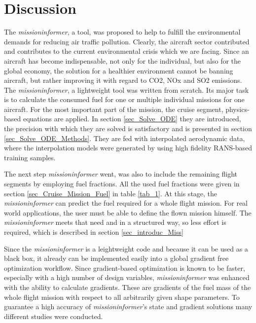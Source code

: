 \chapter{Discussion}
The \emph{missioninformer}, a tool, was 
proposed to  help to fulfill the  
environmental demands for reducing air traffic pollution. Clearly, the aircraft 
sector contributed and contributes 
to the current environmental crisis which we 
are facing. Since an aircraft has become 
indispensable, not only for the individual, 
but also for the global economy, the solution 
for a healthier environment cannot be 
banning aircraft, but rather improving it 
with regard to CO2, NOx and SO2 emissions. 
The \emph{missioninformer}, a lightweight tool was 
written from scratch. 
Its major task is 
to calculate the consumed fuel for
one or multiple individual 
missions for one aircraft. For the most 
important part of the mission, the cruise segment, 
physics-based equations are applied. In section \ref{sec_Solve_ODE}
they are introduced, the precision 
with which they are solved is satisfactory and 
is presented in section \ref{sec_Solve_ODE_Methods}.
They are 
fed with interpolated aerodynamic data, where 
the interpolation models were generated 
by using high fidelity RANS-based training samples.\newline


The next step \emph{missioninformer} 
went, was also to include the remaining 
flight segments by employing fuel fractions.
All the used fuel fractions 
were given in section \ref{sec_Cruise_Mission_Fuel}
in table \ref{tab_1}. 
At this stage, the \emph{missioninformer} 
can predict the fuel required for a whole 
flight mission. For real world applications, 
the user must be able to define the flown mission 
himself. The \emph{missioninformer} meets that need 
and in a structured way, so less effort is required, 
which is described in section \ref{sec_introduc_Miss} \newline


Since the \emph{missioninformer} is a leightweight code and 
because it can be used as a black box, it already
can be implemented easily into a global gradient
free optimization workflow. Since gradient-based 
optimization is known to be faster, especially
with a high number of design variables, 
\emph{missioninformer} was enhanced with the ability 
to calculate gradients. These are gradients of 
the fuel mass of the whole flight mission 
with respect to all arbitrarily given shape parameters. 
To guarantee a high accuracy of  \emph{missioninformer}'s 
state and gradient solutions many different studies 
were conducted.\newline

